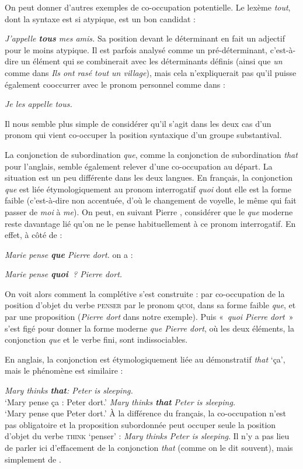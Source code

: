 {    On peut donner d’autres exemples de co-occupation potentielle. Le lexème \textit{tout}, dont la syntaxe est si atypique, est un bon candidat :
    
    \ea
    \textit{{J’appelle \textbf{tous} mes amis.}}
    \z
    Sa position devant le déterminant en fait un adjectif pour le moins atypique. Il est parfois analysé comme un pré-déterminant, c’est-à-dire un élément qui se combinerait avec les déterminants définis (ainsi que \textit{un} comme dans \textit{Ils ont rasé tout un village}), mais cela n’expliquerait pas qu’il puisse également cooccurrer avec le pronom personnel comme dans :

\ea\textit{{Je les appelle tous.}}
    \z

    Il nous semble plus simple de considérer qu’il s’agit dans les deux cas d’un pronom qui vient co-occuper la position syntaxique d’un groupe substantival.

    La conjonction de subordination \textit{que}, comme la conjonction de subordination \textit{that} pour l’anglais, semble également relever d’une co-occupation au départ. La situation est un peu différente dans les deux langues. En français, la conjonction \textit{que} est liée étymologiquement au pronom interrogatif \textit{quoi} dont elle est la forme faible (c’est-à-dire non accentuée, d’où le changement de voyelle, le même qui fait passer de \textit{moi} à \textit{me}). On peut, en suivant Pierre \citet{legoffic1993grammaire}, considérer que le \textit{que} moderne reste davantage lié qu’on ne le pense habituellement à ce pronom interrogatif. En effet, à côté de :

    \ea
    \textit{{Marie pense} \textbf{{que}}  {Pierre dort.}}
    \z
    on a :

    \ea
    \textit{{Marie pense} \textbf{{quoi~}}?  {Pierre dort.}}
    \z

    On voit alors comment la complétive s’est construite : par co-occupation de la position d’objet du verbe \textsc{penser} par le pronom \textsc{quoi}, dans sa forme faible \textit{que}, et par une proposition (\textit{Pierre dort} dans notre exemple). Puis «~\textit{quoi Pierre dort}~» s’est figé pour donner la forme moderne \textit{que Pierre dort}, où les deux éléments, la conjonction \textit{que} et le verbe fini, sont indissociables. 
    
    En anglais, la conjonction est étymologiquement liée au démonstratif \textit{that} ‘ça’, mais le phénomène est similaire :
    
    \ea
    \ea \textit{{Mary thinks} \textbf{{that}}{:}  {Peter is sleeping.} }\\   ‘Mary pense ça : Peter dort.’
    \ex\textit{{Mary thinks} \textbf{{that}}  {Peter is sleeping}.}\\    ‘Mary pense que Peter dort.’
    \z\z
    À la différence du français, la co-occupation n’est pas obligatoire et la proposition subordonnée peut occuper seule la position d’objet du verbe \textsc{think} ‘penser’ : \textit{Mary thinks Peter is sleeping}. Il n’y a pas lieu de parler ici d’effacement de la conjonction \textit{that} (comme on le dit souvent), mais simplement de .

}
